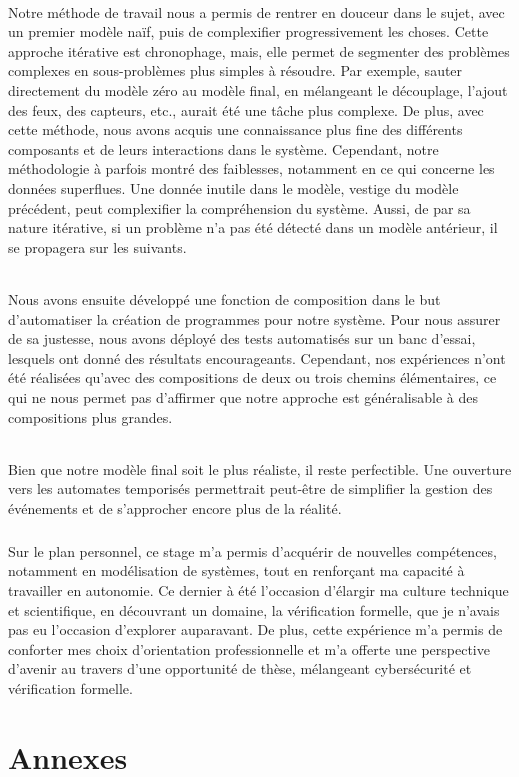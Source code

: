 \documentclass[oneside, a4paper, 11pt]{book}
\begin{document}
\subparagraph{}
Notre méthode de travail nous a permis de rentrer en douceur dans le sujet, avec un premier modèle naïf, puis de complexifier progressivement les choses. Cette approche itérative est chronophage, mais, elle permet de segmenter des problèmes complexes en sous-problèmes plus simples à résoudre.
Par exemple, sauter directement du modèle zéro au modèle final, en mélangeant le découplage, l'ajout des feux, des capteurs, etc., aurait été une tâche plus complexe. De plus, avec cette méthode, nous avons acquis une connaissance plus fine des différents composants et de leurs interactions dans le système.
Cependant, notre méthodologie à parfois montré des faiblesses, notamment en ce qui concerne les données superflues. Une donnée inutile dans le modèle, vestige du modèle précédent, peut complexifier la compréhension du système. Aussi, de par sa nature itérative, si un problème n'a pas été détecté dans un modèle antérieur, il se propagera sur les suivants.

\subparagraph{}
Nous avons ensuite développé une fonction de composition dans le but d'automatiser la création de programmes pour notre système. Pour nous assurer de sa justesse, nous avons déployé des tests automatisés sur un banc d'essai, lesquels ont donné des résultats encourageants.
Cependant, nos expériences n'ont été réalisées qu'avec des compositions de deux ou trois chemins élémentaires, ce qui ne nous permet pas d'affirmer que notre approche est généralisable à des compositions plus grandes.

\subparagraph{}
Bien que notre modèle final soit le plus réaliste, il reste perfectible. Une ouverture vers les automates temporisés permettrait peut-être de simplifier la gestion des événements et de s'approcher encore plus de la réalité.

\paragraph{}
Sur le plan personnel, ce stage m'a permis d'acquérir de nouvelles compétences, notamment en modélisation de systèmes, tout en renforçant ma capacité à travailler en autonomie. Ce dernier à été l'occasion d'élargir ma culture technique et scientifique, en découvrant un domaine, la vérification formelle, que je n'avais pas eu l'occasion d'explorer auparavant.
De plus, cette expérience m'a permis de conforter mes choix d'orientation professionnelle et m'a offerte une perspective d'avenir au travers d'une opportunité de thèse, mélangeant cybersécurité et vérification formelle.

\appendix

\chapter{Annexes}

\backmatter
%
%
\printindex
\end{document}
